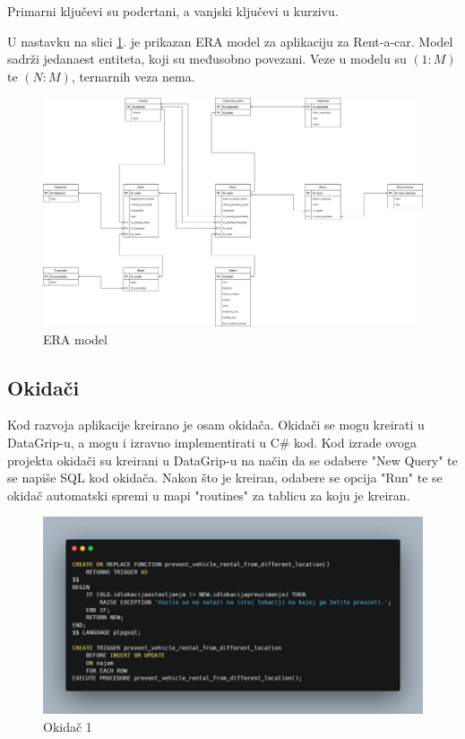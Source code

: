 \documentclass[]{foi} %
\begin{document}
Primarni ključevi su podcrtani, a vanjski ključevi u kurzivu.

U nastavku na slici \ref{fig:era}. je prikazan ERA model za aplikaciju za Rent-a-car. Model sadrži jedanaest entiteta, koji su međusobno povezani. Veze u modelu su $(1:M)$ te $(N:M)$, ternarnih veza nema.

\begin{figure}
    \centering
    \includegraphics[width=1\textwidth]{slike/era.png}
    \caption{ERA model}
    \label{fig:era}
\end{figure}
\newpage

\subsection{Okidači}

Kod razvoja aplikacije kreirano je osam okidača. Okidači se mogu kreirati u DataGrip-u, a mogu i izravno implementirati u C\# kod. Kod izrade ovoga projekta okidači su kreirani u DataGrip-u na način da se odabere "New Query" te se napiše SQL kod okidača. Nakon što je kreiran, odabere se opcija "Run" te se okidač automatski spremi u mapi "routines" za tablicu za koju je kreiran.\\

\begin{figure}[!ht]
    \centering
    \includegraphics[width=1\textwidth]{slike/1.png}
    \caption{Okidač 1}
    \label{fig:prvi}
\end{figure}
\end{document}
